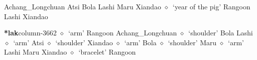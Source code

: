 \hspace{1ex}
         Achang\_Longchuan 
\hspace{1ex}
         Atsi 
\hspace{1ex}
         Bola 
\hspace{1ex}
         Lashi 
\hspace{1ex}
         Maru 
\hspace{1ex}
         Xiandao 
\hspace{1ex}
         $\diamond$~`year of the pig'
         Rangoon 
\hspace{1ex}
         Lashi 
\hspace{1ex}
         Xiandao 
  \item {\footnotesize \textbf{*lak}}{\tiny column-3662}
         $\diamond$~`arm'
         Rangoon 
\hspace{1ex}
         Achang\_Longchuan 
\hspace{1ex}
         $\diamond$~`shoulder'
         Bola 
\hspace{1ex}
         Lashi 
\hspace{1ex}
         $\diamond$~`arm'
         Atsi 
\hspace{1ex}
         $\diamond$~`shoulder'
         Xiandao 
\hspace{1ex}
         $\diamond$~`arm'
         Bola 
\hspace{1ex}
         $\diamond$~`shoulder'
         Maru 
\hspace{1ex}
         $\diamond$~`arm'
         Lashi 
\hspace{1ex}
         Maru 
\hspace{1ex}
         Xiandao 
\hspace{1ex}
         $\diamond$~`bracelet'
         Rangoon 
